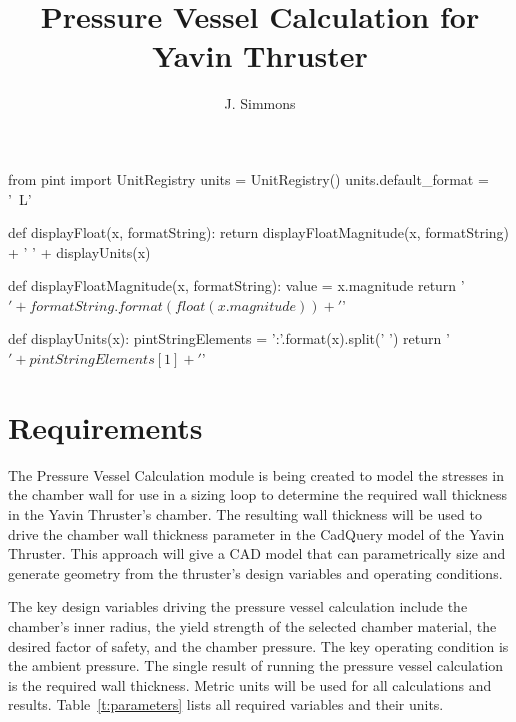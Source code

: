 \documentclass{article}
\title{Pressure Vessel Calculation for Yavin Thruster}
\author{J. Simmons}
\begin{document}
\maketitle

\begin{sagesilent}
from pint import UnitRegistry
units = UnitRegistry()
units.default_format = '~L'

def displayFloat(x, formatString):
  return displayFloatMagnitude(x, formatString) + ' ' + displayUnits(x)
  
def displayFloatMagnitude(x, formatString):
  value = x.magnitude
  return '$' + formatString.format(float(x.magnitude)) + '$'
  
def displayUnits(x):
  pintStringElements = '{:}'.format(x).split(' ')
  return '$' + pintStringElements[1] + '$'
  
\end{sagesilent}

\section{Requirements}
The Pressure Vessel Calculation module is being created to model the stresses in the chamber wall for use in a sizing loop to determine the required wall thickness in the Yavin Thruster's chamber.  The resulting wall thickness will be used to drive the chamber wall thickness parameter in the CadQuery model of the Yavin Thruster.  This approach will give a CAD model that can parametrically size and generate geometry from the thruster's design variables and operating conditions. 

The key design variables driving the pressure vessel calculation include the chamber's inner radius, the yield strength of the selected chamber material, the desired factor of safety, and the chamber pressure.  The key operating condition is the ambient pressure.  The single result of running the pressure vessel calculation is the required wall thickness. Metric units will be used for all calculations and results.  Table~\ref{t:parameters} lists all required variables and their units.
\end{document}
